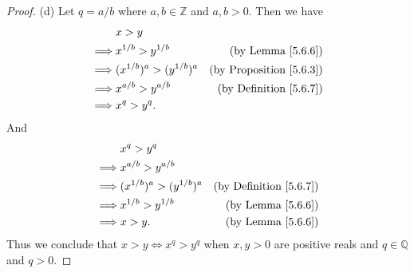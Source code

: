 \begin{proof}{(d)}
Let \(q = a / b\) where \(a, b \in \mathds{Z}\) and \(a, b > 0\).
Then we have
\begin{align*}
& x > y \\
\implies & x^{1 / b} > y^{1 / b} & \text{(by Lemma \ref{5.6.6})} \\
\implies & (x^{1 / b})^a > (y^{1 / b})^a & \text{(by Proposition \ref{5.6.3})} \\
\implies & x^{a / b} > y^{a / b} & \text{(by Definition \ref{5.6.7})} \\
\implies & x^q > y^q.
\end{align*}
And
\begin{align*}
& x^q > y^q \\
\implies & x^{a / b} > y^{a / b} \\
\implies & (x^{1 / b})^a > (y^{1 / b})^a & \text{(by Definition \ref{5.6.7})} \\
\implies & x^{1 / b} > y^{1 / b} & \text{(by Lemma \ref{5.6.6})} \\
\implies & x > y. & \text{(by Lemma \ref{5.6.6})}
\end{align*}
Thus we conclude that \(x > y \iff x^q > y^q\) when \(x, y > 0\) are positive reals and \(q \in \mathds{Q}\) and \(q > 0\).
\end{proof}

